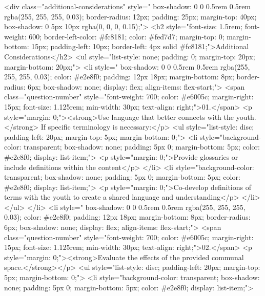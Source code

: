         <div class="additional-considerations" style="  box-shadow: 0 0 0.5rem 0.5rem rgba(255, 255, 255, 0.03); border-radius: 12px; padding: 25px; margin-top: 40px; box-shadow: 0 5px 10px rgba(0, 0, 0, 0.15);">
            <h2 style="font-size: 1.5rem; font-weight: 600; border-left-color: #fc8181; color: #fed7d7; margin-top: 0; margin-bottom: 15px; padding-left: 10px; border-left: 4px solid #fc8181;">Additional Considerations</h2>
            <ul style="list-style: none; padding: 0; margin-top: 20px; margin-bottom: 20px;">
                <li style="  box-shadow: 0 0 0.5rem 0.5rem rgba(255, 255, 255, 0.03); color: #e2e8f0; padding: 12px 18px; margin-bottom: 8px; border-radius: 6px; box-shadow: none; display: flex; align-items: flex-start;">
                    <span class="question-number" style="font-weight: 700; color: #e6005c; margin-right: 15px; font-size: 1.125rem; min-width: 30px; text-align: right;">01.</span>
                    <p style="margin: 0;"><strong>Use language that better connects with the youth.</strong> If specific terminology is necessary:</p>
                    <ul style="list-style: disc; padding-left: 20px; margin-top: 5px; margin-bottom: 0;">
                        <li style="background-color: transparent; box-shadow: none; padding: 5px 0; margin-bottom: 5px; color: #e2e8f0; display: list-item;">
                            <p style="margin: 0;">Provide glossaries or include definitions within the content</p>
                        </li>
                        <li style="background-color: transparent; box-shadow: none; padding: 5px 0; margin-bottom: 5px; color: #e2e8f0; display: list-item;">
                            <p style="margin: 0;">Co-develop definitions of terms with the youth to create a shared language and understanding</p>
                        </li>
                    </ul>
                </li>
                <li style="  box-shadow: 0 0 0.5rem 0.5rem rgba(255, 255, 255, 0.03); color: #e2e8f0; padding: 12px 18px; margin-bottom: 8px; border-radius: 6px; box-shadow: none; display: flex; align-items: flex-start;">
                    <span class="question-number" style="font-weight: 700; color: #e6005c; margin-right: 15px; font-size: 1.125rem; min-width: 30px; text-align: right;">02.</span>
                    <p style="margin: 0;"><strong>Evaluate the effects of the provided communal space.</strong></p>
                    <ul style="list-style: disc; padding-left: 20px; margin-top: 5px; margin-bottom: 0;">
                        <li style="background-color: transparent; box-shadow: none; padding: 5px 0; margin-bottom: 5px; color: #e2e8f0; display: list-item;">
